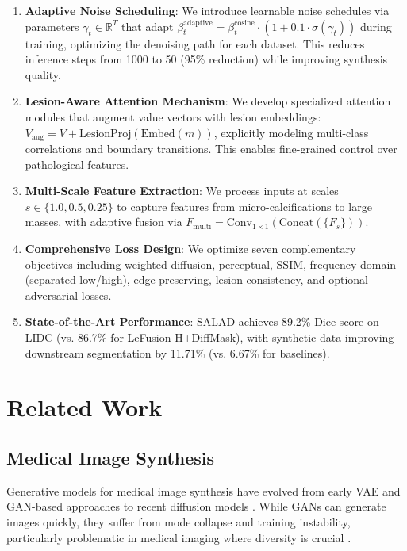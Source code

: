 \documentclass[10pt,twocolumn,letterpaper]{article}
\begin{document}
\begin{enumerate}
    \item \textbf{Adaptive Noise Scheduling}: We introduce learnable noise schedules via parameters $\gamma_t \in \mathbb{R}^T$ that adapt $\beta_t^{\text{adaptive}} = \beta_t^{\text{cosine}} \cdot (1 + 0.1 \cdot \sigma(\gamma_t))$ during training, optimizing the denoising path for each dataset. This reduces inference steps from 1000 to 50 (95\% reduction) while improving synthesis quality.
    
    \item \textbf{Lesion-Aware Attention Mechanism}: We develop specialized attention modules that augment value vectors with lesion embeddings: $V_{\text{aug}} = V + \text{LesionProj}(\text{Embed}(m))$, explicitly modeling multi-class correlations and boundary transitions. This enables fine-grained control over pathological features.
    
    \item \textbf{Multi-Scale Feature Extraction}: We process inputs at scales $s \in \{1.0, 0.5, 0.25\}$ to capture features from micro-calcifications to large masses, with adaptive fusion via $F_{\text{multi}} = \text{Conv}_{1\times1}(\text{Concat}(\{F_s\}))$.
    
    \item \textbf{Comprehensive Loss Design}: We optimize seven complementary objectives including weighted diffusion, perceptual, SSIM, frequency-domain (separated low/high), edge-preserving, lesion consistency, and optional adversarial losses.
    
    \item \textbf{State-of-the-Art Performance}: SALAD achieves 89.2\% Dice score on LIDC (vs. 86.7\% for LeFusion-H+DiffMask), with synthetic data improving downstream segmentation by 11.71\% (vs. 6.67\% for baselines).
\end{enumerate}

\section{Related Work}

\subsection{Medical Image Synthesis}

Generative models for medical image synthesis have evolved from early VAE \cite{kingma2013auto} and GAN-based approaches \cite{goodfellow2020generative} to recent diffusion models \cite{ho2020denoising}. While GANs can generate images quickly, they suffer from mode collapse and training instability, particularly problematic in medical imaging where diversity is crucial \cite{han2019synthesizing, jin2021free}.
\end{document}
